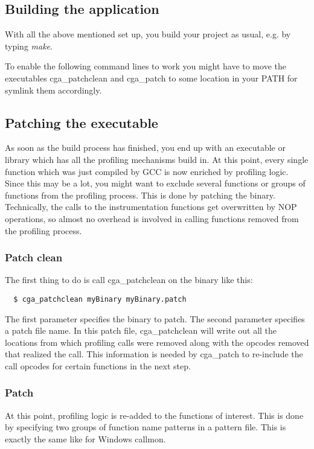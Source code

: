 \subsection{Building the application}

With all the above mentioned set up, you build your project as usual, e.g. by typing \emph{make}.

To enable the following command lines to work you might have to move the executables cga\_patchclean and cga\_patch to some location in your PATH for symlink them accordingly.

\subsection{Patching the executable}

As soon as the build process has finished, you end up with an executable or library which has all the profiling mechanisms build in. At this point, every single function which was just compiled by GCC is now enriched by profiling logic. Since this may be a lot, you might want to exclude several functions or groups of functions from the profiling process. This is done by patching the binary. Technically, the calls to the instrumentation functions get overwritten by NOP operations, so almost no overhead is involved in calling functions removed from the profiling process.

\subsubsection{Patch clean} The first thing to do is call cga\_patchclean on the binary like this:
\begin{verbatim}
  $ cga_patchclean myBinary myBinary.patch
\end{verbatim}
The first parameter specifies the binary to patch. The second parameter specifies a patch file name. In this patch file, cga\_patchclean will write out all the locations from which profiling calls were removed along with the opcodes removed that realized the call. This information is needed by cga\_patch to re-include the call opcodes for certain functions in the next step.

\subsubsection{Patch} At this point, profiling logic is re-added to the functions of interest. This is done by specifying two groups of function name patterns in a pattern file. This is exactly the same like for Windows callmon.

